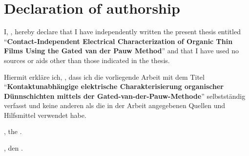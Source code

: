 \chapter*{Declaration of authorship}
\thispagestyle{plain}

\noindent I, \getAuthor, hereby declare that I have independently written the present thesis entitled \enquote{\textbf{Contact-Independent Electrical Characterization of Organic Thin Films Using the Gated van der Pauw Method}} and that I have used no sources or aids other than those indicated in the thesis.

\vspace*{0.5cm}

\noindent Hiermit erkläre ich, \getAuthor, dass ich die vorliegende Arbeit mit dem Titel
\enquote{\textbf{Kontaktunabhängige elektrische Charakterisierung organischer Dünnschichten mittels der Gated-van-der-Pauw-Methode}}
selbstständig verfasst und keine anderen als die in der Arbeit angegebenen Quellen und Hilfsmittel verwendet habe.

\vspace*{1cm}

\noindent \getPrintLocationEN, the \getSubmissionDateEN.

\noindent \getPrintLocationDE, den \getSubmissionDateDE.

\vspace*{2cm}
\par\noindent\makebox[2.5in]{\hspace*{-1pt}\hrulefill}
\par\noindent\makebox[2.5in][l]{\getAuthor}
